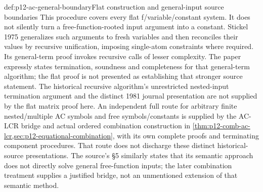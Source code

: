 \begin{proofboundary}{def:p12-ac-general-boundary}{Flat construction and general-input source boundaries}
This procedure covers every flat f/variable/constant system. It does
not silently turn a free-function-rooted input argument into a constant.
Stickel 1975 generalizes such arguments to fresh variables and then
reconciles their values by recursive unification, imposing single-atom
constraints where required. Its general-term proof invokes recursive
calls of lesser complexity. The paper expressly states termination,
soundness and completeness for that general-term algorithm; the flat
proof is not presented as establishing that stronger source statement.
The historical recursive algorithm's unrestricted nested-input
termination argument and the distinct 1981 journal presentation are
not supplied by the flat matrix proof here. An independent full
route for arbitrary finite nested/multiple AC symbols and free
symbols/constants is supplied by the AC-LCR bridge and actual ordered
combination construction in
\cref{thm:p12-comb-ac-lcr,sec:p12-equational-combination}, with its
own complete proofs and terminating component procedures. That route
does not discharge these distinct historical-source presentations.
The source's \S5 similarly states that its semantic approach does
not directly solve general free-function inputs; the later combination
treatment supplies a justified bridge, not an unmentioned extension
of that semantic method.
\cite[pp.~73--76]{Stickel1975AC}
\cite[pp.~504,512--513]{BaaderSnyder2001}
\end{proofboundary}
